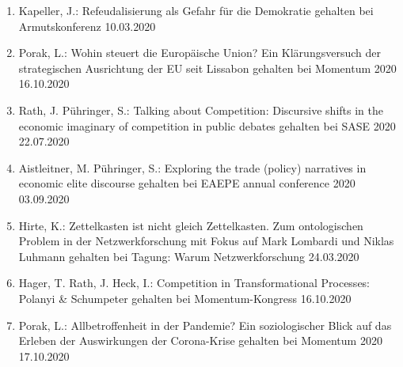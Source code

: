 \begin{enumerate}
	\item Kapeller, J.: Refeudalisierung als Gefahr für die Demokratie gehalten bei Armutskonferenz 10.03.2020
	\item Porak, L.: Wohin steuert die Europäische Union? Ein Klärungsversuch der strategischen Ausrichtung der EU seit Lissabon gehalten bei Momentum 2020 16.10.2020
	\item Rath, J. Pühringer, S.: Talking about Competition: Discursive shifts in the economic imaginary of competition in public debates gehalten bei SASE 2020 22.07.2020
	\item Aistleitner, M. Pühringer, S.: Exploring the trade (policy) narratives in economic elite discourse gehalten bei EAEPE annual conference 2020 03.09.2020
	\item Hirte, K.: Zettelkasten ist nicht gleich Zettelkasten. Zum ontologischen Problem in der Netzwerkforschung mit Fokus auf Mark Lombardi und Niklas Luhmann gehalten bei Tagung: Warum Netzwerkforschung 24.03.2020
	\item Hager, T. Rath, J. Heck, I.: Competition in Transformational Processes: Polanyi \& Schumpeter gehalten bei Momentum-Kongress 16.10.2020
	\item Porak, L.: Allbetroffenheit in der Pandemie? Ein soziologischer Blick auf das Erleben der Auswirkungen der Corona-Krise gehalten bei Momentum 2020 17.10.2020
\end{enumerate}
